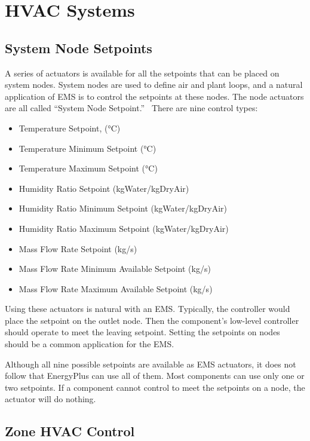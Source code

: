 \section{HVAC Systems}\label{hvac-systems}

\subsection{System Node Setpoints}\label{system-node-setpoints}

A series of actuators is available for all the setpoints that can be placed on system nodes. System nodes are used to define air and plant loops, and a natural application of EMS is to control the setpoints at these nodes. The node actuators are all called ``System Node Setpoint.''~ There are nine control types:

\begin{itemize}
\item
  Temperature Setpoint, (°C)
\item
  Temperature Minimum Setpoint (°C)
\item
  Temperature Maximum Setpoint (°C)
\item
  Humidity Ratio Setpoint (kgWater/kgDryAir)
\item
  Humidity Ratio Minimum Setpoint (kgWater/kgDryAir)
\item
  Humidity Ratio Maximum Setpoint (kgWater/kgDryAir)
\item
  Mass Flow Rate Setpoint (kg/s)
\item
  Mass Flow Rate Minimum Available Setpoint (kg/s)
\item
  Mass Flow Rate Maximum Available Setpoint (kg/s)
\end{itemize}

Using these actuators is natural with an EMS. Typically, the controller would place the setpoint on the outlet node. Then the component's low-level controller should operate to meet the leaving setpoint. Setting the setpoints on nodes should be a common application for the EMS.

Although all nine possible setpoints are available as EMS actuators, it does not follow that EnergyPlus can use all of them. Most components can use only one or two setpoints. If a component cannot control to meet the setpoints on a node, the actuator will do nothing.

\subsection{Zone HVAC Control}\label{zone-hvac-control}

